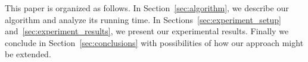 This paper is organized as follows. In Section~\ref{sec:algorithm}, we describe
our algorithm and analyze its running time. In
Sections~\ref{sec:experiment_setup} and~\ref{sec:experiment_results}, we present
our experimental results. Finally we conclude in Section~\ref{sec:conclusions}
with possibilities of how our approach might be extended. 



